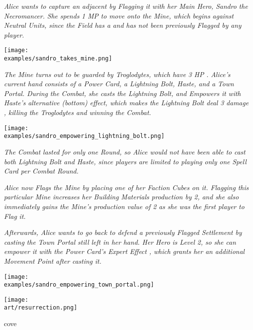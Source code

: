 \begin{multicols*}{2}

\textit{Alice wants to capture an adjacent  by Flagging it with her Main Hero, Sandro the Necromancer.
    She spends 1 MP to move onto the Mine, which begins  against Neutral Units, since the Field has a  and has not been previously Flagged by any player.}\par

\texttt{[image: \\examples/sandro\_takes\_mine.png]}

\textit{The Mine turns out to be guarded by Troglodytes, which have 3 HP .
Alice's current hand consists of a Power Card, a Lightning Bolt, Haste, and a Town Portal.
During the Combat, she casts the Lightning Bolt, and Empowers  it with Haste's alternative (bottom) effect, which makes the Lightning Bolt deal 3 damage , killing the Troglodytes and winning the Combat.}

\texttt{[image: \\examples/sandro\_empowering\_lightning\_bolt.png]}

\columnbreak
\textit{The Combat lasted for only one Round, so Alice would not have been able to cast both Lightning Bolt and Haste, since players are limited to playing only one Spell Card per Combat Round.}\par


\textit{Alice now Flags the Mine by placing one of her Faction Cubes on it.
    Flagging this particular Mine increases her Building Materials  production by 2, and she also immediately gains the Mine's production value of 2  as she was the first player to Flag it.}\par
\textit{Afterwards, Alice wants to go back to defend a previously Flagged Settlement by casting the Town Portal still left in her hand.
    Her Hero is Level 2, so she can empower it with the Power Card's Expert Effect , which grants her an additional Movement Point after casting it.
}

\texttt{[image: \\examples/sandro\_empowering\_town\_portal.png]}

\vfill
\hspace{2em}
{\texttt{[image: \\art/resurrection.png]}}

\begin{expansion}{cove}


\end{expansion}
\end{multicols*}
